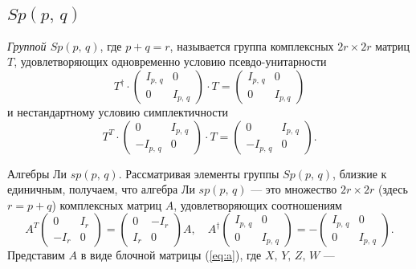 \documentclass[a4paper,12pt]{article}
\begin{document}
\subsection{$Sp(p,\, q)$ }
\begin{dfn}
	\emph{ Группой $Sp(p,\,q)$}, где $p+q=r$, называется группа
	комплексных $2r \times 2r$ матриц $T$, удовлетворяющих одновременно
	условию псевдо-унитарности
	\begin{equation}
	T^\dag \cdot \begin{pmatrix} 
	I_{p,\, q} & 0\\
0 & I_{p,\,q}
\end{pmatrix} \cdot T= \begin{pmatrix}
I_{p,\,q} & 0\\
0 & I_{p,q}\end{pmatrix} 
	\end{equation}
	и нестандартному условию симплектичности
	\begin{equation}
		T^T \cdot \begin{pmatrix} 0 & I_{p,\,q} \\ -I_{p,\,q} & 0
		\end{pmatrix} 
		\cdot T= \begin{pmatrix} 0 & I_{p,\,q} \\ -I_{p,\,q} & 0
		\end{pmatrix} 
	.\end{equation}
\end{dfn}
Алгебры Ли $sp(p,\,q)$. Рассматривая элементы группы $Sp(p,\,q)$, близкие к 
единичным, получаем, что алгебра Ли $sp(p,\,q)$ --- это множество $2r \times 2r$ 
(здесь $r = p +  q$) комплексных матриц $A$, удовлетворяющих соотношениям
 \begin{equation}
	 A^T \begin{pmatrix} 0 & I_r \\ -I_r & 0\end{pmatrix} =
	 \begin{pmatrix} 0 & -I_r \\ I_r & 0 \end{pmatrix} A,
	 \quad A^\dag \begin{pmatrix} I_{p,\,q} & 0 \\ 0 & I_{p,\,q} \end{pmatrix}
	 = - \begin{pmatrix} I_{p,\,q} & 0 \\ 0 & I_{p,\,q} \end{pmatrix} 
	 \label{eq:sp}
.\end{equation}
Представим $A$ в виде блочной матрицы (\ref{eq:a}), где $X,\,Y,\,Z,\,W$ ---
\end{document}
